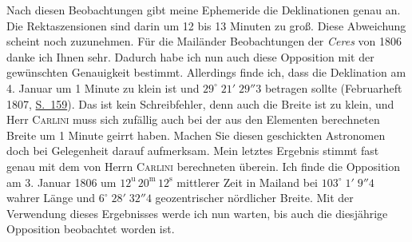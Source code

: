 \par\indent Nach diesen Beobachtungen gibt meine Ephemeride die Deklinationen genau an. Die Rektaszensionen sind darin um 12 bis 13 Minuten zu groß. Diese Abweichung scheint noch zuzunehmen. Für die Mailänder Beobachtungen der \emph{Ceres} von 1806 danke ich Ihnen sehr. Dadurch habe ich nun auch diese Opposition mit der gewünschten Genauigkeit bestimmt. Allerdings finde ich, dass die Deklination am 4. Januar um 1 Minute zu klein ist und $29^\circ\;21'\;29''3$ betragen sollte (Februarheft 1807, \href{https://archive.org/details/bub_gb_sKAAAAAAMAAJ/page/n164/mode/1up}{S.~159}). Das ist kein Schreibfehler, denn auch die Breite ist zu klein, und Herr \textsc{Carlini} muss sich zufällig auch bei der aus den Elementen berechneten Breite um 1 Minute geirrt haben. Machen Sie diesen geschickten Astronomen doch bei Gelegenheit darauf aufmerksam. Mein letztes Ergebnis stimmt fast genau mit dem von Herrn \textsc{Carlini} berechneten überein. Ich finde die Opposition am 3. Januar 1806 um $12^{\mathrm u}\,20^{\mathrm m}\,12^{\mathrm s}$ mittlerer Zeit in Mailand bei $103^\circ\;1'\;9''4$ wahrer Länge und $6^\circ\;28'\;32''4$ geozentrischer nördlicher Breite. Mit der Verwendung dieses Ergebnisses werde ich nun warten, bis auch die diesjährige Opposition beobachtet worden ist.

